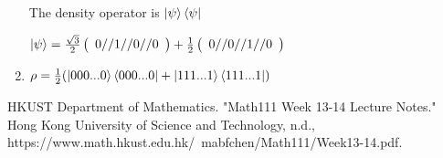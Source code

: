 \documentclass{article}
\begin{document}
\begin{enumerate}
    The density operator is $\ket{\psi}\bra{\psi}$

    $\ket{\psi}=\frac{\sqrt{3}}{2}\left(\begin{array}{c}
        0//1//0//0
    \end{array}\right)+\frac{1}{2}\left(\begin{array}{c}
        0//0//1//0
    \end{array}\right)$
    
    
    \item $\rho=\frac{1}{2}(\ket{000...0}\bra{000...0}+\ket{111...1}\bra{111...1})$
\end{enumerate}

\begin{thebibliography}{99}
    HKUST Department of Mathematics.
    "Math111 Week 13-14 Lecture Notes."
    Hong Kong University of Science and Technology, n.d.,
    https://www.math.hkust.edu.hk/~mabfchen/Math111/Week13-14.pdf.
\end{thebibliography}
\end{document}
